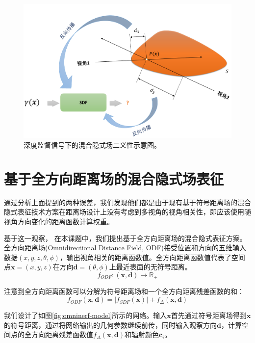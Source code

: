\begin{figure}[ht]
    \centering
    \includegraphics[width=\textwidth]{undergraduate-thesis/images/omni-nerf/omninerf-error1.pdf}
    \caption{深度监督信号下的混合隐式场二义性示意图。}
    \label{fig:omni-nerf depth error}
\end{figure}


\section{基于全方向距离场的混合隐式场表征}
通过分析上面提到的两种误差，我们发现他们都是由于现有基于符号距离场的混合隐式表征技术方案在距离场设计上没有考虑到多视角的视角相关性，即应该使用随视角方向变化的距离函数计算权重。

基于这一观察， 在本课题中，我们提出基于全方向距离场的混合隐式表征方案。全方向距离场(Omnidirectional Distance Field, ODF)接受位置和方向的五维输入数据$(x,y,z,\theta,\phi)$，输出视角相关的距离函数值。全方向距离函数值代表了空间点$\mathbf{x}=(x,y,z)$在方向$\mathbf{d}=(\theta,\phi)$上最近表面的无符号距离。
\begin{equation}
    f_{ODF}: (\mathbf{x},\mathbf{d})\to \mathbb{R}_+
    \label{eq: omninerf-odf function}
\end{equation}

注意到全方向距离函数可以分解为符号距离场和一个全方向距离残差函数的和：
\begin{equation}
    f_{ODF}(\mathbf{x}, \mathbf{d}) = |f_{SDF}(\mathbf{x})| + f_\Delta(\mathbf{x}, \mathbf{d})
    \label{eq: omninerf-odf decomposition}
\end{equation}

我们设计了如图\ref{fig:omninerf-model}所示的网络。输入$\mathbf{x}$首先通过符号距离场得到$\mathbf{x}$的符号距离，通过将网络输出的几何参数继续前传，同时输入观察方向$\mathbf{d}$，计算空间点的全方向距离残差函数值$f_\Delta(\mathbf{x},\mathbf{d})$和辐射颜色$\mathbf{c}_i$。

